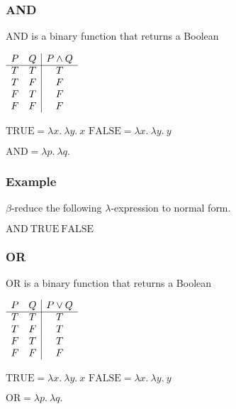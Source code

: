 \documentclass{beamer}
\begin{document}
\begin{frame}
	\frametitle{AND}

	AND is a binary function that returns a Boolean

	\begin{center}
		$\begin{array}{ c c | c }			
			P & Q & P \land Q\\
			\cline{1 - 3}
			T & T & T \\ 
			T & F & F \\ 
			F & T & F \\ 
			F & F & F
		\end{array}$
	\end{center}

	$\text{TRUE} = \lambda x. \ \lambda y. \ x$ \hspace{4cm} $\text{FALSE} = \lambda x. \ \lambda y. \ y$

	\vspace{0.5cm}

	$\text{AND} = \lambda p. \ \lambda q. \  $

	\vspace{5cm}
	
\end{frame}

\begin{frame}
	\frametitle{Example}

	$\beta$-reduce the following $\lambda$-expression to normal form.

	\vspace{0.5cm}

	$\text{AND} \ \text{TRUE} \ \text{FALSE}$

	\vspace{6cm}


\end{frame}

\begin{frame}
	\frametitle{OR}

	OR is a binary function that returns a Boolean

	\begin{center}
		$\begin{array}{ c c | c }			
			P & Q & P \lor Q\\
			\cline{1 - 3}
			T & T & T \\ 
			T & F & T \\ 
			F & T & T \\ 
			F & F & F
		\end{array}$
	\end{center}

	$\text{TRUE} = \lambda x. \ \lambda y. \ x$ \hspace{4cm} $\text{FALSE} = \lambda x. \ \lambda y. \ y$

	\vspace{0.5cm}

	$\text{OR} = \lambda p. \ \lambda q. \  $

	\vspace{5cm}
	
\end{frame}
\end{document}
